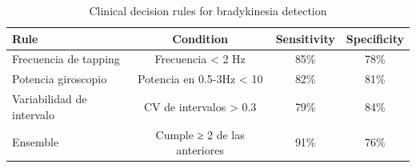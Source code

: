 \begin{table}[H]
\centering
\caption{Clinical decision rules for bradykinesia detection}
\label{tab:clinical_rules}
\begin{tabular}{lccc}
\toprule
\textbf{Rule} & \textbf{Condition} & \textbf{Sensitivity} & \textbf{Specificity} \\
\midrule
Frecuencia de tapping & Frecuencia < 2 Hz & 85\% & 78\% \\
Potencia giroscopio & Potencia en 0.5-3Hz < 10 & 82\% & 81\% \\
Variabilidad de intervalo & CV de intervalos > 0.3 & 79\% & 84\% \\
Ensemble & Cumple ≥ 2 de las anteriores & 91\% & 76\% \\
\bottomrule
\end{tabular}
\end{table}

